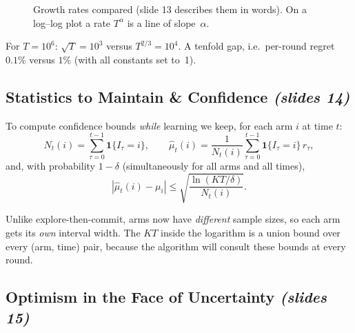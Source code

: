 \documentclass[11pt,a4paper]{article}
\newcommand{\ind}{\mathbf{1}}
\newcommand{\slides}[1]{\emph{(slides #1)}}
\theoremstyle{plain}
\theoremstyle{definition}
\theoremstyle{remark}
\begin{document}
\begin{figure}[ht]
\centering
{}
\caption{Growth rates compared (slide 13 describes them in words). On a log--log plot a rate $T^\alpha$ is a line of slope~$\alpha$.}
\end{figure}

\begin{intuition}
For $T=10^6$: $\sqrt T=10^3$ versus $T^{2/3}=10^4$. A tenfold gap, i.e.\ per-round regret $0.1\%$ versus $1\%$ (with all constants set to~1).
\end{intuition}

\subsection{Statistics to Maintain \& Confidence \slides{14}}

To compute confidence bounds \emph{while} learning we keep, for each arm $i$ at time $t$:
\[
 N_t(i)=\sum_{\tau=0}^{t-1}\ind\{I_\tau=i\},\qquad
 \hat\mu_t(i)=\frac{1}{N_t(i)}\sum_{\tau=0}^{t-1}\ind\{I_\tau=i\}\,r_\tau ,
\]
and, with probability $1-\delta$ (simultaneously for all arms and all times),
\[
 |\hat\mu_t(i)-\mu_i|\le\sqrt{\frac{\ln(KT/\delta)}{N_t(i)}} .
\]

\begin{intuition}
Unlike explore-then-commit, arms now have \emph{different} sample sizes, so each arm gets its \emph{own} interval width.
The $KT$ inside the logarithm is a union bound over every (arm, time) pair, because the algorithm will consult these bounds at every round.
\end{intuition}

\subsection{Optimism in the Face of Uncertainty \slides{15}}
\end{document}
